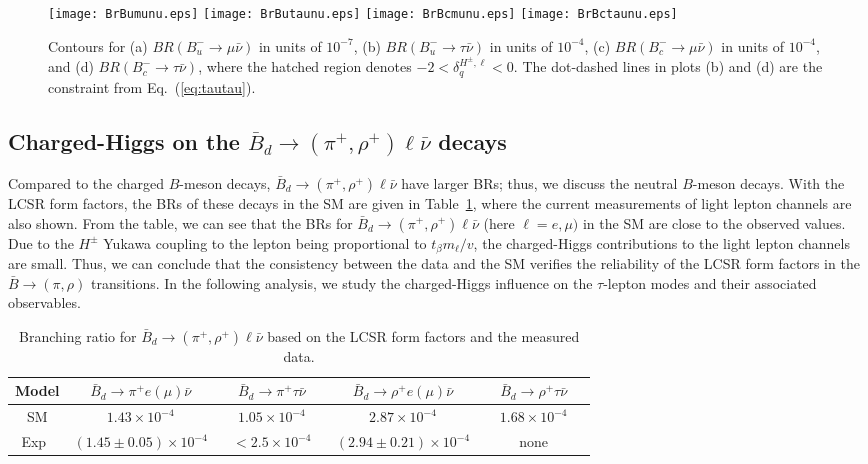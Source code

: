 \documentclass[prd,preprint,superscriptaddress,amsmath,amssymb]{revtex4}
\begin{document}
   
  \begin{figure}[tb]
\texttt{[image: BrBumunu.eps]}
\texttt{[image: BrButaunu.eps]}
\texttt{[image: BrBcmunu.eps]}
\texttt{[image: BrBctaunu.eps]}
\caption{  Contours for  (a) $BR(B^-_u\to \mu \bar \nu)$ in units of $10^{-7}$, (b) $BR(B^-_u\to \tau \bar \nu)$ in units of $10^{-4}$, (c) $BR(B^-_c\to \mu \bar \nu)$ in units of $10^{-4}$, and (d) $BR(B^-_c\to \tau \bar \nu)$, where the hatched region denotes $-2 < \delta^{H^\pm, \ell}_{q} < 0$. The dot-dashed lines in plots (b) and (d) are the constraint from Eq.~(\ref{eq:tautau}).}
\label{fig:Bellnu}
\end{figure} 

  
  \subsection{ Charged-Higgs on the $\bar B_d \to (\pi^+, \rho^+) \ell \bar \nu$ decays}
  
 Compared to the charged $B$-meson decays,  $\bar B_d \to (\pi^+, \rho^+) \ell \bar \nu$ have larger BRs;  thus, we discuss the neutral $B$-meson decays.  With the LCSR form factors, the BRs of these decays in the SM are given in Table~\ref{tab:Bpi_rho}, where the current measurements of light lepton channels  are also shown. From the table, we can see that the BRs for $\bar B_d \to (\pi^+,\rho^+) \ell \bar \nu$ (here $\ell=e, \mu)$ in the SM  are close to the observed values.  Due to the $H^\pm$ Yukawa coupling to the lepton being proportional to $t_\beta m_\ell /v$, the charged-Higgs contributions to the light lepton channels are small. Thus, we can conclude that the consistency between the data and the SM verifies the reliability of the LCSR  form factors in the $\bar B \to (\pi, \rho)$ transitions. In the following analysis, we  study the charged-Higgs influence on the $\tau$-lepton modes and their associated observables.  
  
  \begin{table}[htbp]
 \caption{Branching ratio for $\bar B_d \to ( \pi^+, \rho^+) \ell \bar \nu$ based on the LCSR form factors and the measured data. }
  \label{tab:Bpi_rho}
  \begin{tabular}{ c|cccc}\hline \hline
Model & ~~$\bar B_d \to \pi^+ e(\mu)\bar \nu$~~ & ~~$\bar B_d \to \pi^+ \tau \bar \nu$~~ &  ~~$\bar B_d \to \rho^+ e(\mu) \bar \nu$~~ & ~~$\bar B_d \to \rho^+ \tau \bar \nu$~~ \\  \hline
SM  & $1.43 \times 10^{-4}$  & $1.05 \times 10^{-4}$ & $2.87 \times 10^{-4}$ &  $1.68 \times 10^{-4}$\\  \hline
 Exp~\cite{PDG} & $(1.45\pm 0.05)\times 10^{-4}$ & $<2.5 \times 10^{-4} $ & $(2.94\pm 0.21)\times 10^{-4}$ &  none\\  \hline \hline

  \end{tabular}
 \end{table}
    
\end{document}
